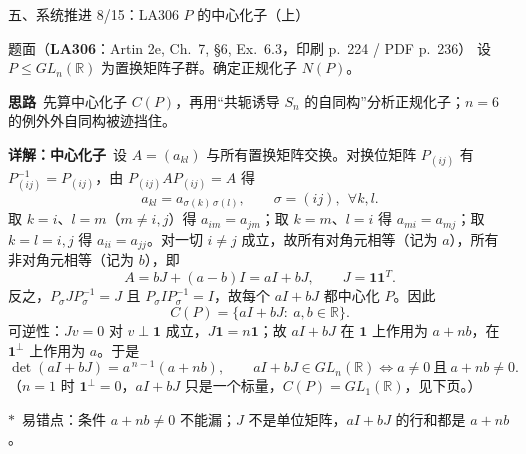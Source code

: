 \documentclass[aspectratio=169,10pt,fontset=none]{ctexbeamer}
\newcommand{\ex}[1]{\textcolor{accent}{\footnotesize\bfseries #1}}
\newcommand{\key}[1]{\textcolor{ink}{\bfseries #1}}
\newcommand{\starpt}{\textcolor{accent}{\bfseries$\ast$}}
\begin{document}
\begin{frame}[t]{五、系统推进 8/15：LA306 $P$ 的中心化子（上）}
\label{ex:LA306}
\scriptsize
\begin{block}{\footnotesize 题面（\ex{LA306}：Artin 2e, Ch.~7, \S6, Ex.~6.3，印刷 p.~224 / PDF p.~236）}
设 $P\le GL_n(\mathbb R)$ 为置换矩阵子群。确定正规化子 $N(P)$。
\end{block}
\vspace{-0.6mm}
\key{思路}\ 先算中心化子 $C(P)$，再用“共轭诱导 $S_n$ 的自同构”分析正规化子；$n=6$ 的例外外自同构被迹挡住。

\key{详解：中心化子}\ 设 $A=(a_{kl})$ 与所有置换矩阵交换。对换位矩阵 $P_{(ij)}$ 有 $P_{(ij)}^{-1}=P_{(ij)}$，由 $P_{(ij)}AP_{(ij)}=A$ 得
\[
a_{kl}=a_{\sigma(k)\,\sigma(l)},\qquad \sigma=(ij),\ \ \forall k,l.
\]
取 $k=i$、$l=m$（$m\ne i,j$）得 $a_{im}=a_{jm}$；取 $k=m$、$l=i$ 得 $a_{mi}=a_{mj}$；取 $k=l=i,j$ 得 $a_{ii}=a_{jj}$。对一切 $i\ne j$ 成立，故所有对角元相等（记为 $a$），所有非对角元相等（记为 $b$），即
\[
A=bJ+(a-b)I=aI+bJ,\qquad J=\mathbf{1}\mathbf{1}^T.
\]
反之，$P_\sigma JP_\sigma^{-1}=J$ 且 $P_\sigma IP_\sigma^{-1}=I$，故每个 $aI+bJ$ 都中心化 $P$。因此
\[
C(P)=\{aI+bJ:\ a,b\in\mathbb R\}.
\]
可逆性：$Jv=0$ 对 $v\perp\mathbf{1}$ 成立，$J\mathbf{1}=n\mathbf{1}$；故 $aI+bJ$ 在 $\mathbf{1}$ 上作用为 $a+nb$，在 $\mathbf{1}^{\perp}$ 上作用为 $a$。于是
\[
\det(aI+bJ)=a^{\,n-1}(a+nb),\qquad aI+bJ\in GL_n(\mathbb R)\iff a\ne0\ \text{且}\ a+nb\ne0.
\]
（$n=1$ 时 $\mathbf{1}^{\perp}=0$，$aI+bJ$ 只是一个标量，$C(P)=GL_1(\mathbb R)$，见下页。）

\starpt\ 易错点：条件 $a+nb\ne0$ 不能漏；$J$ 不是单位矩阵，$aI+bJ$ 的行和都是 $a+nb$。
\end{frame}
\end{document}
